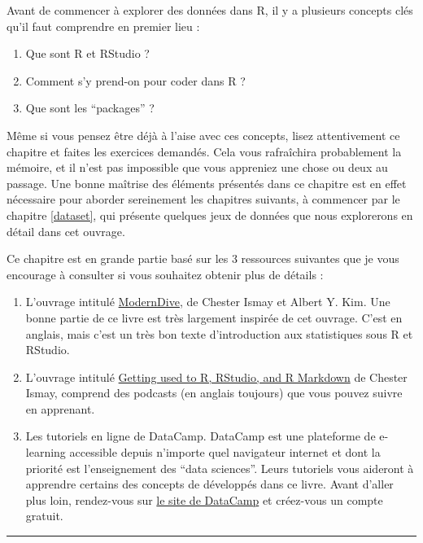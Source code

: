\documentclass[a4paperpaper,]{article}
\providecommand{\tightlist}{%
  \setlength{\itemsep}{0pt}\setlength{\parskip}{0pt}}
\begin{document}
Avant de commencer à explorer des données dans R, il y a plusieurs concepts clés qu'il faut comprendre en premier lieu :

\begin{enumerate}
\def\labelenumi{\arabic{enumi}.}
\tightlist
\item
  Que sont R et RStudio ?
\item
  Comment s'y prend-on pour coder dans R ?
\item
  Que sont les ``packages'' ?
\end{enumerate}

Même si vous pensez être déjà à l'aise avec ces concepts, lisez attentivement ce chapitre et faites les exercices demandés. Cela vous rafraîchira probablement la mémoire, et il n'est pas impossible que vous appreniez une chose ou deux au passage. Une bonne maîtrise des éléments présentés dans ce chapitre est en effet nécessaire pour aborder sereinement les chapitres suivants, à commencer par le chapitre \ref{dataset}, qui présente quelques jeux de données que nous explorerons en détail dans cet ouvrage.

Ce chapitre est en grande partie basé sur les 3 ressources suivantes que je vous encourage à consulter si vous souhaitez obtenir plus de détails :

\begin{enumerate}
\def\labelenumi{\arabic{enumi}.}
\tightlist
\item
  L'ouvrage intitulé \href{https://moderndive.com/index.html}{ModernDive}, de Chester Ismay et Albert Y. Kim. Une bonne partie de ce livre est très largement inspirée de cet ouvrage. C'est en anglais, mais c'est un très bon texte d'introduction aux statistiques sous R et RStudio.
\item
  L'ouvrage intitulé \href{https://ismayc.github.io/rbasics-book/}{Getting used to R, RStudio, and R Markdown} de Chester Ismay, comprend des podcasts (en anglais toujours) que vous pouvez suivre en apprenant.
\item
  Les tutoriels en ligne de DataCamp. DataCamp est une plateforme de e-learning accessible depuis n'importe quel navigateur internet et dont la priorité est l'enseignement des ``data sciences''. Leurs tutoriels vous aideront à apprendre certains des concepts de développés dans ce livre. Avant d'aller plus loin, rendez-vous sur \href{https://www.datacamp.com/}{le site de DataCamp} et créez-vous un compte gratuit.
\end{enumerate}

\begin{center}\rule{0.5\linewidth}{\linethickness}\end{center}
\end{document}
